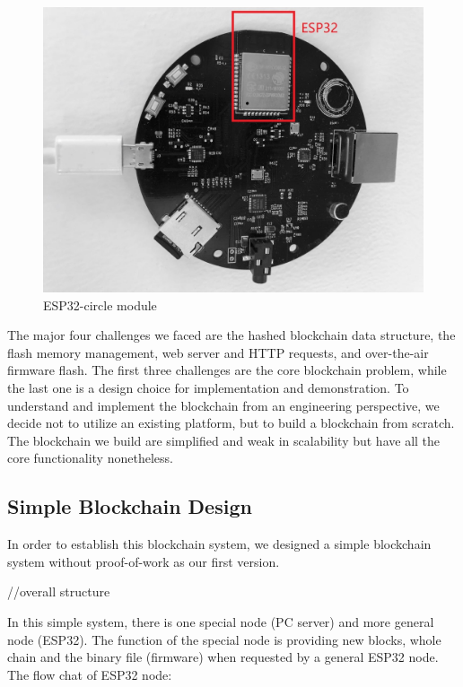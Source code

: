 \documentclass{article}
\begin{document}
    \begin{figure}[h!]
      \centering
      \includegraphics[scale=0.2]{esp32-circle.jpg}
      \caption{ESP32-circle module}
      \label{fig:esp_circle}
    \end{figure}

    The major four challenges we faced are the hashed blockchain data structure, the flash memory management, web server and HTTP requests, and over-the-air firmware flash. The first three challenges are the core blockchain problem, while the last one is a design choice for implementation and demonstration. To understand and implement the blockchain from an engineering perspective, we decide not to utilize an existing platform, but to build a blockchain from scratch. The blockchain we build are simplified and weak in scalability but have all the core functionality nonetheless.

    \subsection{Simple Blockchain Design}
        In order to establish this blockchain system, we designed a simple blockchain system without proof-of-work as our first version.

        //overall structure

        In this simple system, there is one special node (PC server) and more general node (ESP32). The function of the special node is providing new blocks, whole chain and the binary file (firmware) when requested by a general ESP32 node. The flow chat of ESP32 node:
\end{document}
